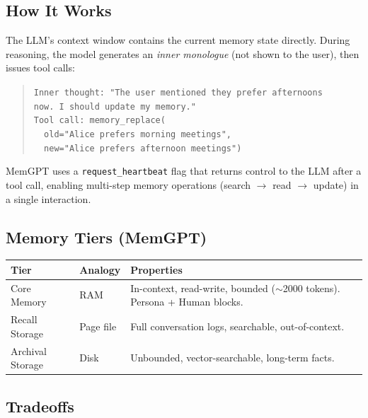 \documentclass[11pt, letterpaper]{article}
\begin{document}
\subsection{How It Works}

The LLM's context window contains the current memory state directly. During reasoning,
the model generates an \emph{inner monologue} (not shown to the user), then issues
tool calls:

\begin{quote}
\small
\texttt{Inner thought: "The user mentioned they prefer afternoons}\\
\texttt{now. I should update my memory."}\\[0.3em]
\texttt{Tool call: memory\_replace(}\\
\texttt{~~old="Alice prefers morning meetings",}\\
\texttt{~~new="Alice prefers afternoon meetings")}
\end{quote}

\noindent MemGPT uses a \texttt{request\_heartbeat} flag that returns control to the LLM
after a tool call, enabling multi-step memory operations (search $\rightarrow$ read $\rightarrow$ update)
in a single interaction.

\subsection{Memory Tiers (MemGPT)}

\begin{table}[h]
\centering
\begin{tabularx}{\textwidth}{llX}
\toprule
\textbf{Tier} & \textbf{Analogy} & \textbf{Properties} \\
\midrule
Core Memory & RAM & In-context, read-write, bounded ($\sim$2000 tokens). Persona + Human blocks. \\
Recall Storage & Page file & Full conversation logs, searchable, out-of-context. \\
Archival Storage & Disk & Unbounded, vector-searchable, long-term facts. \\
\bottomrule
\end{tabularx}
\end{table}

\subsection{Tradeoffs}
\end{document}
